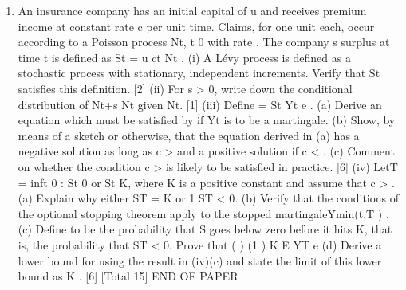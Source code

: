 \documentclass[a4paper,12pt]{article}
\begin{document}
\begin{enumerate}
\item An insurance company has an initial capital of u and receives premium income at constant rate c per unit time. Claims, for one unit each, occur according to a Poisson process {Nt, t 0} with rate . The company s surplus at time t is defined as
St = u ct Nt .
(i) A Lévy process is defined as a stochastic process with stationary, independent
increments. Verify that St satisfies this definition. [2]
(ii) For s > 0, write down the conditional distribution of Nt+s Nt given Nt. [1]
(iii) Define = St
Yt e .
(a) Derive an equation which must be satisfied by if Yt is to be a
martingale.
(b) Show, by means of a sketch or otherwise, that the equation derived in (a) has a negative solution as long as c > and a positive solution
if c < .
(c) Comment on whether the condition c > is likely to be satisfied in practice. [6]
(iv) LetT = inf{t 0 : St 0 or St K}, where K is a positive constant and assume that c > .
(a) Explain why either ST = K or 1 ST < 0.
(b) Verify that the conditions of the optional stopping theorem apply to the stopped martingaleYmin(t,T ) .
(c) Define to be the probability that S goes below zero before it hits K,
that is, the probability that ST < 0. Prove that
( ) (1 ) K
E YT e
(d) Derive a lower bound for using the result in (iv)(c) and state the
limit of this lower bound as K . [6]
[Total 15]
END OF PAPER



\end{enumerate}
\end{document}
